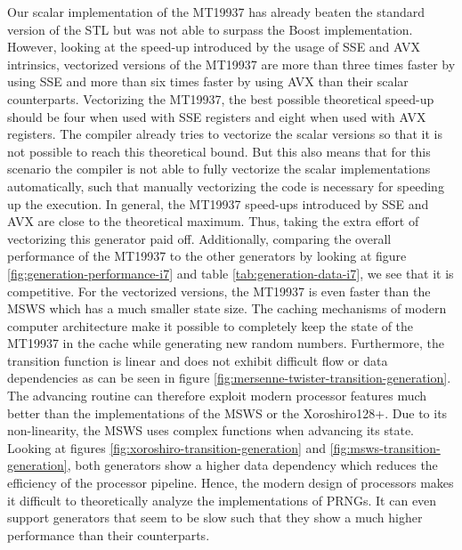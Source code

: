 \documentclass{stdlocal}
\begin{document}
    Our scalar implementation of the MT19937 has already beaten the standard version of the STL but was not able to surpass the Boost implementation.
    However, looking at the speed-up introduced by the usage of SSE and AVX intrinsics, vectorized versions of the MT19937 are more than three times faster by using SSE and more than six times faster by using AVX than their scalar counterparts.
    Vectorizing the MT19937, the best possible theoretical speed-up should be four when used with SSE registers and eight when used with AVX registers.
    The compiler already tries to vectorize the scalar versions so that it is not possible to reach this theoretical bound.
    But this also means that for this scenario the compiler is not able to fully vectorize the scalar implementations automatically, such that manually vectorizing the code is necessary for speeding up the execution.
    In general, the MT19937 speed-ups introduced by SSE and AVX are close to the theoretical maximum.
    Thus, taking the extra effort of vectorizing this generator paid off.
    Additionally, comparing the overall performance of the MT19937 to the other generators by looking at figure \ref{fig:generation-performance-i7} and table \ref{tab:generation-data-i7}, we see that it is competitive.
    For the vectorized versions, the MT19937 is even faster than the MSWS which has a much smaller state size.
    The caching mechanisms of modern computer architecture make it possible to completely keep the state of the MT19937 in the cache while generating new random numbers.
    Furthermore, the transition function is linear and does not exhibit difficult flow or data dependencies as can be seen in figure \ref{fig:mersenne-twister-transition-generation}.
    The advancing routine can therefore exploit modern processor features much better than the implementations of the MSWS or the Xoroshiro128+.
    Due to its non-linearity, the MSWS uses complex functions when advancing its state.
    Looking at figures \ref{fig:xoroshiro-transition-generation} and \ref{fig:msws-transition-generation}, both generators show a higher data dependency which reduces the efficiency of the processor pipeline.
    Hence, the modern design of processors makes it difficult to theoretically analyze the implementations of PRNGs.
    It can even support generators that seem to be slow such that they show a much higher performance than their counterparts.
\end{document}
